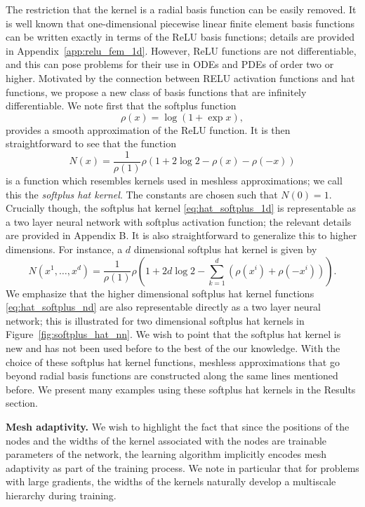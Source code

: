 \documentclass[12pt]{article}
\begin{document}
The restriction that the kernel is a radial basis function can be easily removed. It is well known \cite{HLXZ2020} that one-dimensional piecewise linear finite element basis functions can be written exactly in terms of the ReLU basis functions; details are provided in Appendix~\ref{app:relu_fem_1d}. However, ReLU functions are not differentiable, and this can pose problems for their use in ODEs and PDEs of order two or higher. Motivated by the connection between RELU activation functions and hat functions, we propose a new class of basis functions that are infinitely differentiable. We note first that the softplus function
\begin{equation} \label{eq:softplus}
\rho(x) = \log (1 + \exp x),
\end{equation}
provides a smooth approximation of the ReLU function. It is then straightforward to see that the function
\begin{equation} \label{eq:hat_softplus_1d}
N(x) = \frac{1}{\rho(1)}\rho\left(1 + 2\log 2 - \rho(x) - \rho(-x)\right)
\end{equation}
is a function which resembles kernels used in meshless approximations; we call this the \emph{softplus hat kernel}. The constants are chosen such that $N(0) = 1$. Crucially though, the softplus hat kernel \eqref{eq:hat_softplus_1d} is representable as a two layer neural network with softplus activation function; the relevant details are provided in Appendix B. It is also straightforward to generalize this to higher dimensions. For instance, a $d$ dimensional softplus hat kernel is given by
\begin{equation} \label{eq:hat_softplus_nd}
N(x^1, \ldots, x^d) = \frac{1}{\rho(1)}\rho\left(1 + 2d\log 2 - \sum_{k=1}^d (\rho(x^i) + \rho(-x^i))\right).
\end{equation}
We emphasize that the higher dimensional softplus hat kernel functions \eqref{eq:hat_softplus_nd} are also representable directly as a two layer neural network; this is illustrated for two dimensional softplus hat kernels in Figure~\ref{fig:softplus_hat_nn}. We wish to point that the softplus hat kernel is new and has not been used before to the best of the our knowledge. With the choice of these softplus hat kernel functions, meshless approximations that go beyond radial basis functions are constructed along the same lines mentioned before. We present many examples using these softplus hat kernels in the Results section.

\textbf{Mesh adaptivity.} We wish to highlight the fact that since the positions of the nodes and the widths of the kernel associated with the nodes are trainable parameters of the network, the learning algorithm implicitly encodes mesh adaptivity as part of the training process. We note in particular that for problems with large gradients, the widths of the kernels naturally develop a multiscale hierarchy during training.
\end{document}
